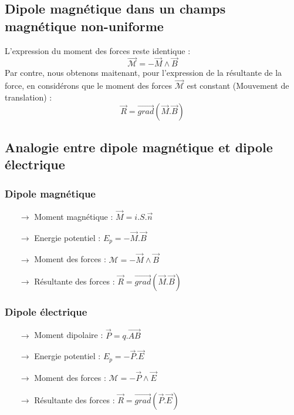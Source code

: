 \subsection{Dipole magnétique dans un champs magnétique non-uniforme}
\begin{prop}
L'expression du moment des forces reste identique :
$$\overrightarrow{\mathcal{M}} = - \overrightarrow{M}\wedge \overrightarrow{B}$$
Par contre, nous obtenons maitenant, pour l'expression de la résultante de la force, en considérons que le moment des forces $\overrightarrow{\mathcal{M}}$ est constant (Mouvement de translation) :
$$\overrightarrow{R} = \overrightarrow{grad}(\overrightarrow{M}.\overrightarrow{B})$$
\end{prop}
\subsection{Analogie entre dipole magnétique et dipole électrique}
\subsubsection{Dipole magnétique}
\begin{itemize}
 \item[$\rightarrow$] Moment magnétique : $\overrightarrow{M} = i.S.\overrightarrow{n}$
 \item[$\rightarrow$] Energie potentiel : $E_p = -\overrightarrow{M}.\overrightarrow{B}$
 \item[$\rightarrow$] Moment des forces : $\mathcal{M} = - \overrightarrow{M}\wedge\overrightarrow{B}$
 \item[$\rightarrow$] Résultante des forces : $\overrightarrow{R} = \overrightarrow{grad}(\overrightarrow{M}.\overrightarrow{B})$
\end{itemize}
\subsubsection{Dipole électrique}
\begin{itemize}
 \item[$\rightarrow$] Moment dipolaire : $\overrightarrow{P} = q.\overrightarrow{AB}$
 \item[$\rightarrow$] Energie potentiel : $E_p = -\overrightarrow{P}.\overrightarrow{E}$
 \item[$\rightarrow$] Moment des forces : $\mathcal{M} = - \overrightarrow{P}\wedge\overrightarrow{E}$
 \item[$\rightarrow$] Résultante des forces : $\overrightarrow{R} = \overrightarrow{grad}(\overrightarrow{P}.\overrightarrow{E})$
\end{itemize}
